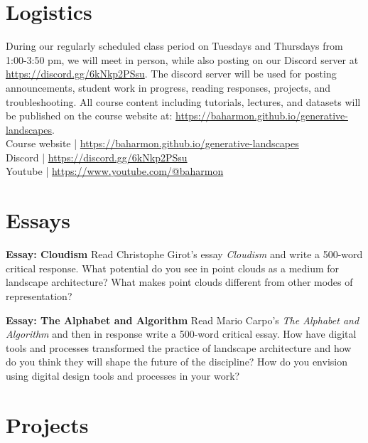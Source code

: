 \documentclass[11pt,article,oneside]{memoir}
\begin{document}
\section{Logistics}

During our regularly scheduled class period
on Tuesdays and Thursdays from 1:00-3:50 pm,
we will meet in person, while also posting
on our Discord server at \url{https://discord.gg/6kNkp2PSsu}.
The discord server will be used for posting
announcements, student work in progress, 
reading responses, projects, and troubleshooting. 
All course content including tutorials, lectures, and datasets
will be published on the course website at:
\url{https://baharmon.github.io/generative-landscapes}.\\

\noindent
Course website | \url{https://baharmon.github.io/generative-landscapes}\\
Discord | \url{https://discord.gg/6kNkp2PSsu}\\
Youtube | \url{https://www.youtube.com/@baharmon}\\

\section{Essays}

\noindent \textbf{Essay: Cloudism}
Read Christophe Girot's essay \emph{Cloudism}
and write a 500-word critical response. 
What potential do you see in point clouds
as a medium for landscape architecture?
What makes point clouds different
from other modes of representation?
\nocite{*} \printbibliography[keyword=a, heading=none]

\noindent \textbf{Essay: The Alphabet and Algorithm}
Read Mario Carpo's \emph{The Alphabet and Algorithm}
and then in response write a 500-word critical essay.
How have digital tools and processes transformed 
the practice of landscape architecture
and how do you think they will shape 
the future of the discipline?
How do you envision using
digital design tools and processes in your work?

\nocite{*} \printbibliography[keyword=b, heading=none]

\section{Projects}
\end{document}
